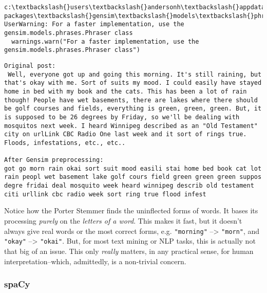 \documentclass[11pt]{article}
\begin{document}
    \begin{Verbatim}[commandchars=\\\{\}]
c:\textbackslash{}users\textbackslash{}andersonh\textbackslash{}appdata\textbackslash{}local\textbackslash{}programs\textbackslash{}python\textbackslash{}python36\textbackslash{}lib\textbackslash{}site-packages\textbackslash{}gensim\textbackslash{}models\textbackslash{}phrases.py:486: UserWarning: For a faster implementation, use the gensim.models.phrases.Phraser class
  warnings.warn("For a faster implementation, use the gensim.models.phrases.Phraser class")

    \end{Verbatim}

    \begin{Verbatim}[commandchars=\\\{\}]
Original post:
 Well, everyone got up and going this morning. It's still raining, but that's okay with me. Sort of suits my mood. I could easily have stayed home in bed with my book and the cats. This has been a lot of rain though! People have wet basements, there are lakes where there should be golf courses and fields, everything is green, green, green. But, it is supposed to be 26 degrees by Friday, so we'll be dealing with mosquitos next week. I heard Winnipeg described as an "Old Testament" city on urlLink CBC Radio One last week and it sort of rings true. Floods, infestations, etc., etc.. 

After Gensim preprocessing:
got go morn rain okai sort suit mood easili stai home bed book cat lot rain peopl wet basement lake golf cours field green green green suppos degre fridai deal mosquito week heard winnipeg describ old testament citi urllink cbc radio week sort ring true flood infest

    \end{Verbatim}

    Notice how the Porter Stemmer finds the uninflected forms of words. It
bases its processing \emph{purely} on the \emph{letters of a word}. This
makes it fast, but it doesn't always give real words or the most correct
forms, e.g. \texttt{"morning"} --\textgreater{} \texttt{"morn"}, and
\texttt{"okay"} --\textgreater{} \texttt{"okai"}. But, for most text
mining or NLP tasks, this is actually not that big of an issue. This
only \emph{really} matters, in any practical sense, for human
interpretation--which, admittedly, is a non-trivial concern.

    \hypertarget{spacy}{%
\subsubsection{spaCy}\label{spacy}}
\end{document}
